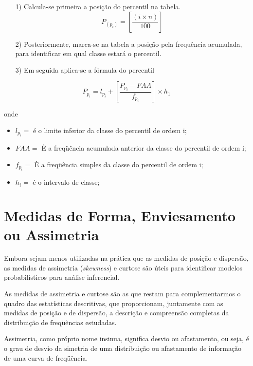 \begin{enumerate}
\item [{1)}]Calcula-se primeira a posição do percentil na tabela.
$$ P_{(p_{i})} = \left[ \frac{(i \times n)}{100} \right] $$
\item [{2)}] Posteriormente, marca-se na tabela a posição pela frequência acumulada, para identificar em qual classe estará o percentil.
\item [{3)}] Em seguida aplica-se a fórmula do percentil
\end{enumerate}

\begin{equation}\label{}
    P_{p_{i}}= l_{p_{i}}+\left[\frac{P_{p_{i}}-FAA}{f_{p_{i}}}\right]\times h_{1}
\end{equation}

 onde

 \begin{itemize}
   \item $l_{p_{i}}=$ é o limite inferior da classe do percentil de ordem i;
   \item $FAA=$ È a freqüência acumulada anterior da classe do percentil de ordem i;
   \item $f_{p_{i}}=$ È a freqüência simples da classe do percentil de ordem i;
   \item $h_{i}=$ é o intervalo de classe;
 \end{itemize}



\section{Medidas de Forma, Enviesamento ou Assimetria }

\inic Embora sejam menos utilizadas na prática que as medidas de posição e
dispersão, as medidas de assimetria (\textit{skewness}) e curtose são úteis para
identificar modelos probabilísticos para análise inferencial.

\inic As medidas de assimetria e curtose são as que restam para complementarmos o quadro das estatísticas descritivas, que proporcionam, juntamente com as medidas de posição e de dispersão, a descrição e compreensão completas da distribuição de freqüências estudadas.\vskip0.3cm

Assimetria, como próprio nome insinua, significa desvio ou afastamento, ou seja, é o grau de desvio da simetria de uma distribuição ou afastamento de informação de uma curva de freqüência.\vskip0.3cm




